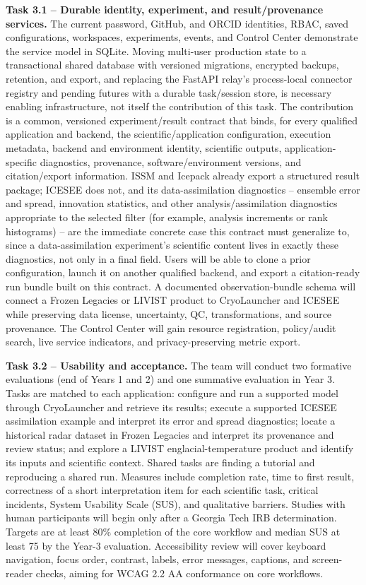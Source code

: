 \textbf{Task 3.1 -- Durable identity, experiment, and result/provenance
services.} The current password, GitHub, and ORCID identities, RBAC, saved
configurations, workspaces, experiments, events, and Control Center
demonstrate the service model in SQLite. Moving multi-user production state to
a transactional shared database with versioned migrations, encrypted backups,
retention, and export, and replacing the FastAPI relay's process-local
connector registry and pending futures with a durable task/session store, is
necessary enabling infrastructure, not itself the contribution of this task.
The contribution is a common, versioned experiment/result contract that binds,
for every qualified application and backend, the scientific/application
configuration, execution metadata, backend and environment identity,
scientific outputs, application-specific diagnostics, provenance,
software/environment versions, and citation/export information. ISSM and
Icepack already export a structured result package; ICESEE does not, and its
data-assimilation diagnostics -- ensemble error and spread, innovation
statistics, and other analysis/assimilation diagnostics appropriate to the
selected filter (for example, analysis increments or rank histograms) --
are the immediate concrete case this contract must generalize to, since a
data-assimilation experiment's scientific content lives in exactly these
diagnostics, not only in a final field. Users
will be able to clone a prior configuration, launch it on another qualified
backend, and export a citation-ready run bundle built on this contract. A
documented observation-bundle schema will connect a Frozen Legacies or LIVIST
product to CryoLauncher and ICESEE while preserving data license, uncertainty,
QC, transformations, and source provenance. The Control Center will gain
resource registration, policy/audit search, live service indicators, and
privacy-preserving metric export.

\textbf{Task 3.2 -- Usability and acceptance.} The team will conduct two
formative evaluations (end of Years 1 and 2) and one summative evaluation in
Year 3. Tasks are matched to each application:
configure and run a supported model through CryoLauncher and retrieve its
results; execute a supported ICESEE assimilation example and interpret its
error and spread diagnostics; locate a historical radar dataset in Frozen
Legacies and interpret its provenance and review status; and explore a LIVIST
englacial-temperature product and identify its inputs and scientific context.
Shared tasks are finding a tutorial and reproducing a shared run. Measures
include completion rate, time to first result, correctness of a short
interpretation item for each scientific task, critical incidents, System
Usability Scale (SUS), and qualitative barriers. Studies with human
participants will begin only after a Georgia Tech IRB determination.
Targets are at least 80\% completion of the core workflow and median SUS at
least 75 by the Year-3 evaluation. Accessibility review will cover keyboard
navigation, focus order, contrast, labels, error messages, captions, and
screen-reader checks, aiming for WCAG 2.2 AA conformance on core workflows.

